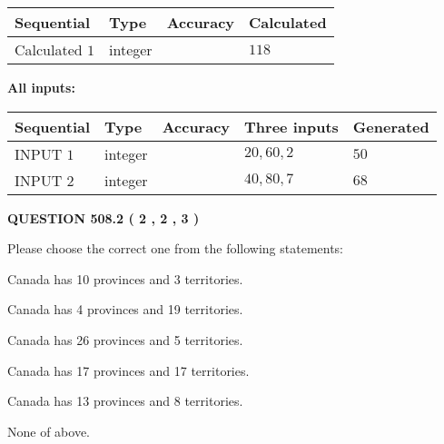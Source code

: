 \documentclass[12pt]{article}
\begin{document}
   
   
   
\noindent{}
   
   
  
  
\noindent\begin{tabular}{|l|l|l|l|}
\hline
 Sequential & Type & Accuracy & Calculated \\ 
\hline
 
 
  Calculated $  1 $ & integer &  & 
  $ 118 $ 
 \\  \hline  
 \end{tabular}
   
   
   
   
\noindent\vspace{0.1in}\hspace{-0.08in} {\textbf{\Large{All inputs: }}}
   
   
  
  
\noindent\begin{tabular}{|l|l|l|l|l|}
\hline
 Sequential & Type & Accuracy & Three inputs & Generated \\ 
\hline
 
 
  INPUT $  1 $ & integer &  & $
 20
 , 
 60
 , 
 2
 $ & $ 50 $ 
 \\  \hline  
 
 
  INPUT $  2 $ & integer &  & $
 40
 , 
 80
 , 
 7
 $ & $ 68 $ 
 \\  \hline  
 \end{tabular}
   
   
  
\vspace{0.2in}
  
{\textbf{\Large{QUESTION
508.2 
 ( 2 , 2 , 3 )
}}}
  
  
Please choose the correct one from the following statements:
 
 
Canada has 10  provinces and 3 territories.
 
 
Canada has   4 provinces and  19 territories.
 
 
Canada has  26 provinces and  5 territories.
 
 
Canada has  17 provinces and  17 territories.
 
 
Canada has  13 provinces and  8 territories.
 
 
 None of above.
 
\end{document}
